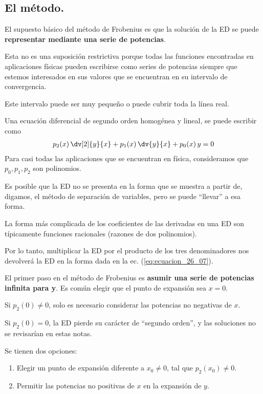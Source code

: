 \subsection{El método.}

El supuesto básico del método de Frobenius es que la solución de la ED se puede \textbf{representar mediante una serie de potencias}.
\par
Esta no es una suposición restrictiva porque todas las funciones encontradas en aplicaciones físicas pueden escribirse como series de potencias siempre que estemos interesados en sus valores que se encuentran en su intervalo de convergencia.
\par
Este intervalo puede ser muy pequeño o puede cubrir toda la línea real.
\par
Una ecuación diferencial de segundo orden homogénea y lineal, se puede escribir como
\begin{align}
p_{2} (x) \, \dv[2]{y}{x} + p_{1} (x) \, \dv{y}{x} + p_{0} (x) \, y = 0
\label{eq:ecuacion_26_07}    
\end{align}
Para casi todas las aplicaciones que se encuentran en física, consideramos que $p_{0}, p_{1}, p_{2}$ son polinomios.
\par
Es posible que la ED no se presenta en la forma que se muestra a partir de, digamos, el método de separación de variables, pero se puede \enquote{llevar} a esa forma.
\par
La forma más complicada de los coeficientes de las derivadas en una ED son típicamente funciones racionales (razones de dos polinomios).
\par
Por lo tanto, multiplicar la ED por el producto de los tres denominadores nos devolverá la ED en la forma dada en la ec. (\ref{eq:ecuacion_26_07}).
\par
El primer paso en el método de Frobenius es \textbf{asumir una serie de potencias infinita para y}. Es común elegir que el punto de expansión sea $x = 0$.
\par
Si $p_{2} (0) \neq 0$, solo es necesario considerar las potencias no negativas de $x$.
\par
Si $p_{2} (0) = 0$, la ED pierde su carácter de \enquote{segundo orden}, y las soluciones no se revisarían en estas notas.
\par
Se tienen dos opciones:
\begin{enumerate}
\item Elegir un punto de expansión diferente a $x_{0} \neq 0$, tal que $p_{2} (x_{0}) \neq 0$.
\item Permitir las potencias no positivas de $x$ en la expansión de $y$.
\end{enumerate}
